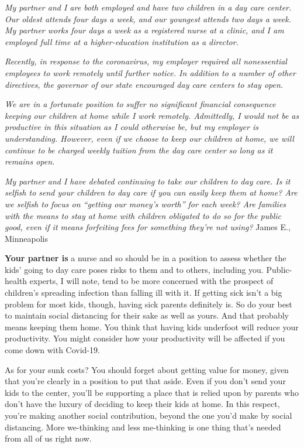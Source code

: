\emph{My partner and I are both employed and have two children in a day
care center. Our oldest attends four days a week, and our youngest
attends two days a week. My partner works four days a week as a
registered nurse at a clinic, and I am employed full time at a
higher-education institution as a director.}

\emph{Recently, in response to the coronavirus, my employer required all
nonessential employees to work remotely until further notice. In
addition to a number of other directives, the governor of our state
encouraged day care centers to stay open.}

\emph{We are in a fortunate position to suffer no significant financial
consequence keeping our children at home while I work remotely.
Admittedly, I would not be as productive in this situation as I could
otherwise be, but my employer is understanding. However, even if we
choose to keep our children at home, we will continue to be charged
weekly tuition from the day care center so long as it remains open.}

\emph{My partner and I have debated continuing to take our children to
day care. Is it selfish to send your children to day care if you can
easily keep them at home? Are we selfish to focus on ``getting our
money's worth'' for each week? Are families with the means to stay at
home with children obligated to do so for the public good, even if it
means forfeiting fees for something they're not using?} James E.,
Minneapolis

\textbf{Your partner is} a nurse and so should be in a position to
assess whether the kids' going to day care poses risks to them and to
others, including you. Public-health experts, I will note, tend to be
more concerned with the prospect of children's spreading infection than
falling ill with it. If getting sick isn't a big problem for most kids,
though, having sick parents definitely is. So do your best to maintain
social distancing for their sake as well as yours. And that probably
means keeping them home. You think that having kids underfoot will
reduce your productivity. You might consider how your productivity will
be affected if you come down with Covid-19.

As for your sunk costs? You should forget about getting value for money,
given that you're clearly in a position to put that aside. Even if you
don't send your kids to the center, you'll be supporting a place that is
relied upon by parents who don't have the luxury of deciding to keep
their kids at home. In this respect, you're making another social
contribution, beyond the one you'd make by social distancing. More
we-thinking and less me-thinking is one thing that's needed from all of
us right now.

